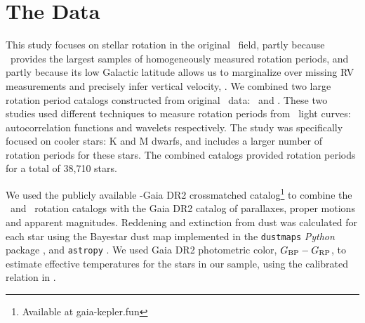 \section{The Data}
\label{sec:data}

This study focuses on stellar rotation in the original \kepler\ field, partly
because \kepler\ provides the largest samples of homogeneously measured
rotation periods, and partly because its low Galactic latitude allows us to
marginalize over missing RV measurements and precisely infer vertical
velocity, \vz.
We combined two large rotation period catalogs constructed from original
\kepler\ data: \mct\ and \sant.
These two studies used different techniques to measure rotation periods from
\kepler\ light curves: autocorrelation functions and wavelets respectively.
The \citet{santos2019} study was specifically focused on cooler stars: K and M
dwarfs, and includes a larger number of rotation periods for these stars.
The combined catalogs provided rotation periods for a total of 38,710 stars.

We used the publicly available \kepler-Gaia DR2 crossmatched
catalog\footnote{Available at gaia-kepler.fun} to combine the \mct\ and \sant\
rotation catalogs with the Gaia DR2 catalog of parallaxes, proper motions
and apparent magnitudes.
Reddening and extinction from dust was calculated for each star using the
Bayestar dust map implemented in the {\tt dustmaps} {\it Python} package
\citep{green2018}, and {\tt astropy} \citep{astropy2013, astropy2018}.
We used Gaia DR2 photometric color, $G_{\rm BP} - G_{\rm RP}$, to estimate
effective temperatures for the stars in our sample, using the calibrated
relation in \citet{curtis2020}.


